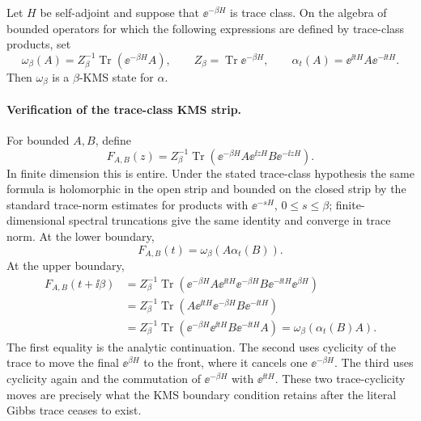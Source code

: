 \begin{example}
\label{ex:gibbs-trace-kms}
Let \(H\) be self-adjoint and suppose that
\(\ee^{-\beta H}\) is trace class.  On the algebra of bounded operators for
which the following expressions are defined by trace-class products, set
\[
  \omega_\beta(A)
  =
  Z_\beta^{-1}\operatorname{Tr}\left(\ee^{-\beta H}A\right),
  \qquad
  Z_\beta=\operatorname{Tr}\ee^{-\beta H},
  \qquad
  \alpha_t(A)=\ee^{\ii tH}A\ee^{-\ii tH}.
\]
Then \(\omega_\beta\) is a \(\beta\)-KMS state for \(\alpha\).
\end{example}

\paragraph{Verification of the trace-class KMS strip.}
For bounded \(A,B\), define
\[
  F_{A,B}(z)
  =
  Z_\beta^{-1}
  \operatorname{Tr}\left(
    \ee^{-\beta H}A\ee^{\ii zH}B\ee^{-\ii zH}
  \right).
\]
In finite dimension this is entire.  Under the stated trace-class hypothesis
the same formula is holomorphic in the open strip and bounded on the closed
strip by the standard trace-norm estimates for products with
\(\ee^{-sH}\), \(0\le s\le\beta\); finite-dimensional spectral truncations
give the same identity and converge in trace norm.  At the lower boundary,
\[
  F_{A,B}(t)=\omega_\beta(A\alpha_t(B)).
\]
At the upper boundary,
\[
\begin{aligned}
  F_{A,B}(t+\ii\beta)
  &=
  Z_\beta^{-1}
  \operatorname{Tr}\left(
    \ee^{-\beta H}A\ee^{\ii tH}\ee^{-\beta H}
    B\ee^{-\ii tH}\ee^{\beta H}
  \right)  \\
  &=
  Z_\beta^{-1}
  \operatorname{Tr}\left(
    A\ee^{\ii tH}\ee^{-\beta H}B\ee^{-\ii tH}
  \right)  \\
  &=
  Z_\beta^{-1}
  \operatorname{Tr}\left(
    \ee^{-\beta H}\ee^{\ii tH}B\ee^{-\ii tH}A
  \right)
  =
  \omega_\beta(\alpha_t(B)A).
\end{aligned}
\]
The first equality is the analytic continuation.  The second uses cyclicity of
the trace to move the final \(\ee^{\beta H}\) to the front, where it cancels
one \(\ee^{-\beta H}\).  The third uses cyclicity again and the commutation of
\(\ee^{-\beta H}\) with \(\ee^{\ii tH}\).  These two trace-cyclicity moves are
precisely what the KMS boundary condition retains after the literal Gibbs
trace ceases to exist.

